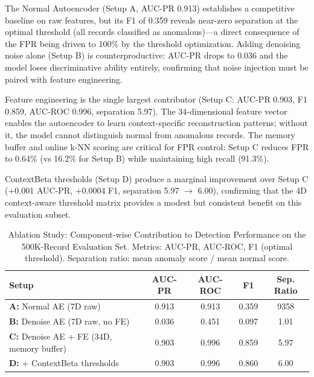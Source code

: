 The Normal Autoencoder (Setup A, AUC-PR 0.913) establishes a competitive baseline on raw features, but its F1 of 0.359 reveals near-zero separation at the optimal threshold (all records classified as anomalous)---a direct consequence of the FPR being driven to 100\% by the threshold optimization. Adding denoising noise alone (Setup B) is counterproductive: AUC-PR drops to 0.036 and the model loses discriminative ability entirely, confirming that noise injection must be paired with feature engineering.

Feature engineering is the single largest contributor (Setup C: AUC-PR 0.903, F1 0.859, AUC-ROC 0.996, separation 5.97). The 34-dimensional feature vector enables the autoencoder to learn context-specific reconstruction patterns; without it, the model cannot distinguish normal from anomalous records. The memory buffer and online k-NN scoring are critical for FPR control: Setup C reduces FPR to 0.64\% (vs 16.2\% for Setup B) while maintaining high recall (91.3\%).

ContextBeta thresholds (Setup D) produce a marginal improvement over Setup C (+0.001 AUC-PR, +0.0004 F1, separation 5.97 $\rightarrow$ 6.00), confirming that the 4D context-aware threshold matrix provides a modest but consistent benefit on this evaluation subset.

\begin{table}[H]
\centering
\caption{Ablation Study: Component-wise Contribution to Detection Performance on the 500K-Record Evaluation Set.
Metrics: AUC-PR, AUC-ROC, F1 (optimal threshold). Separation ratio: mean anomaly score / mean normal score.}
\label{tab:ablation}
\begin{tabular}{
  !{\extracolsep{\fill}}
  l
  S[table-format=1.4]
  S[table-format=1.4]
  S[table-format=1.3]
  S[table-format=1.2]
}
\toprule
\textbf{Setup} & \textbf{AUC-PR} & \textbf{AUC-ROC} & \textbf{F1} & \textbf{Sep. Ratio} \\
\midrule
\textbf{A:} Normal AE (7D raw) & 0.913 & 0.913 & 0.359 & 9358 \\
\textbf{B:} Denoise AE (7D raw, no FE) & 0.036 & 0.451 & 0.097 & 1.01 \\
\textbf{C:} Denoise AE + FE (34D, memory buffer) & 0.903 & 0.996 & 0.859 & 5.97 \\
\textbf{D:} + ContextBeta thresholds & 0.903 & 0.996 & 0.860 & 6.00 \\
\bottomrule
\end{tabular}
\end{table}

